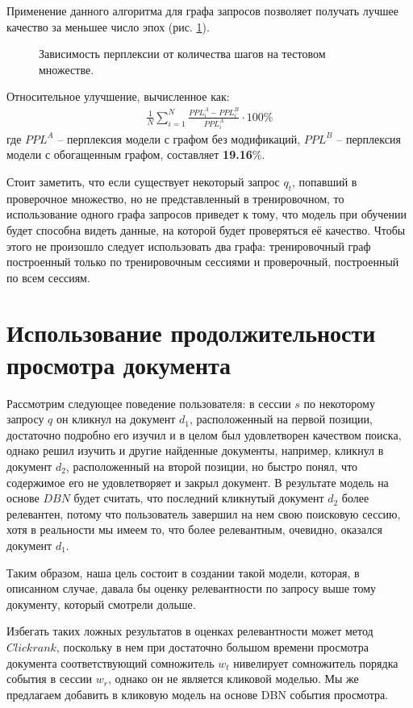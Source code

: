 \documentclass[diploma]{nanolab2015}
\begin{document}
Применение данного алгоритма для графа запросов позволяет получать лучшее качество за меньшее число эпох (рис. \ref{pic6}). 

\begin{figure}[ht]
    \setcounter{figure}{5}
    
    \caption{Зависимость перплексии от количества шагов на тестовом множестве.}
    \label{pic6}
\end{figure}

Относительное улучшение, вычисленное как:
\begin{align}
    \frac{1}{N} \sum_{i=1}^{N} \frac{PPL_i^A - PPL_i^B}{PPL_i^A} \cdot 100\%
\end{align}
где $PPL^A$ -- перплексия модели с графом без модификаций, $PPL^B$ -- перплексия модели с обогащенным графом, составляет \textbf{19.16}\%. 

Стоит заметить, что если существует некоторый запрос $q_t$, попавший в проверочное множество, но не представленный в тренировочном, то использование одного графа запросов приведет к тому, что модель при обучении будет способна видеть данные, на которой будет проверяться её качество. Чтобы этого не произошло следует использовать два графа: тренировочный граф построенный только по тренировочным сессиями и проверочный, построенный по всем сессиям.

\section{Использование продолжительности просмотра документа}
Рассмотрим следующее поведение пользователя: в сессии $s$ по некоторому запросу $q$ он кликнул на документ $d_1$, расположенный на первой позиции, достаточно подробно его изучил и в целом был удовлетворен качеством поиска, однако решил изучить и другие найденные документы, например, кликнул в документ $d_2$, расположенный на второй позиции, но быстро понял, что содержимое его не удовлетворяет и закрыл документ. В результате модель на основе $DBN$ будет считать, что последний кликнутый документ $d_2$ более релевантен, потому что пользователь завершил на нем свою поисковую сессию, хотя в реальности мы имеем то, что более релевантным, очевидно, оказался документ $d_1$.

Таким образом, наша цель состоит в создании такой модели, которая, в описанном случае, давала бы оценку релевантности по запросу выше тому документу, который смотрели дольше. 

Избегать таких ложных результатов в оценках релевантности может метод $Clickrank$, поскольку в нем при достаточно большом времени просмотра документа соответствующий сомножитель $w_t$ нивелирует сомножитель порядка события в сессии $w_r$, однако он не является кликовой моделью. Мы же предлагаем добавить в кликовую модель на основе DBN события просмотра.
\end{document}
